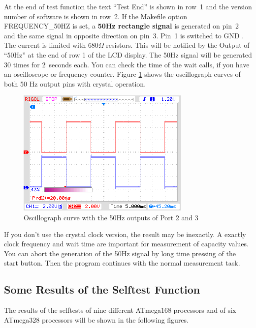 At the end of test function the text ``Test End''  is shown in row~1 and the version number of software is shown in row~2.
If the Makefile option FREQUENCY\_50HZ is set, a {\bf 50Hz rectangle signal} is generated on pin~2 and 
the same signal in opposite direction on pin~3.
Pin~1 is switched to GND . The current is limited with \(680\Omega\) resistors.
This will be notified by the Output of ``50Hz'' at the end of row 1 of the LCD display.
The 50Hz signal will be generated 30 times for 2~seconds each.
You can check the time of the wait calls, if you have an oscilloscope or frequency counter.
Figure \ref{fig:Frequency50} shows the oscillograph curves of both 50 Hz output pins with crystal operation.

\begin{figure}[H]
\centering
\includegraphics[]{../PNG/Frequency50.png}
\caption{Oscillograph curve with the 50Hz outputs of Port 2 and 3}
\label{fig:Frequency50}
\end{figure}


If you don't use the crystal clock version, the result may be inexactly.
A exactly clock frequency and wait time are important for measurement of capacity values.
You can abort the generation of the 50Hz signal by long time pressing of the start button.
Then the program continues with the normal measurement task.

\subsection{Some Results of the Selftest Function}

The results of the selftests of nine different ATmega168 processors and of six ATmega328 processors
will be shown in the following figures.

